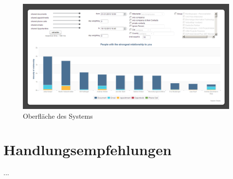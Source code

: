 \begin{figure}[htbp]
\centering
\includegraphics[width=\textwidth]{pics/final_screen.png}
\caption{Oberfläche des Systems}
\label{ergebniss_oberflaeche}
\end{figure}


\section{Handlungsempfehlungen}

...
